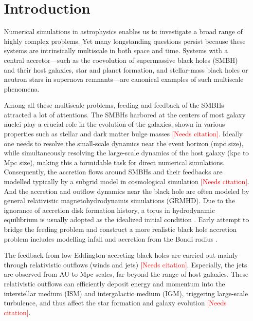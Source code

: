 \documentclass[%
 reprint,
 superscriptaddress,
 amsmath,amssymb,
 nofootinbib,
 prd,
]{revtex4-2}
\newcommand{\red}{\textcolor{red}}
\newcommand{\AddCite}{\red{[Needs citation]}}
\newcommand{\hywcom}[1]{{\color{purple}{[HYW: #1]}}}
\begin{document}
\section{Introduction}

\hywcom{Multiscale problems.}
Numerical simulations in astrophysics enables us to investigate a broad range of highly complex problems.
Yet many longstanding questions persist because these systems are intrinsically multiscale in both space and time.
Systems with a central accretor—such as the coevolution of supermassive black holes (SMBH) and their host galaxies, star and planet formation, and stellar-mass black holes or neutron stars in supernova remnants—are canonical examples of such multiscale phenomena.

Among all these multiscale problems, feeding and feedback of the SMBHs attracted a lot of attentions.
The SMBHs harbored at the centers of most galaxy nuclei play a crucial role in the evolution of the galaxies, shown in various properties such as stellar and dark matter bulge masses \AddCite.
Ideally one needs to resolve the small-scale dynamics near the event horizon (mpc size), while simultaneously
resolving the large-scale dynamics of the host galaxy (kpc to Mpc size),
making this a formidable task for direct numerical simulations.
Consequently, the accretion flows around SMBHs and their feedbacks are modelled typically by a subgrid model in cosmological simulation \AddCite. 
And the accretion and outflow dynamics near the black hole are often modeled by general relativistic magnetohydrodynamis simulations (GRMHD).
Due to the ignorance of accretion disk formation history, a torus in hydrodynamic equilibrium is usually adopted as the idealized initial condition \cite{1976ApJ...207..962F}.
Early attempt to bridge the feeding problem and construct a more realistic black hole accretion problem includes modelling infall and accretion from the Bondi radius \cite{Bondi:1952MNRAS.112..195B}.

\hywcom{Relativistic outflows.}
The feedback from low-Eddington accreting black holes are carried out mainly through relativistic outflows (winds and jets) \AddCite.
Especially, the jets are observed from AU to Mpc scales, far beyond the range of host galaxies. 
These relativistic outflows can efficiently deposit energy and momentum into the interstellar medium (ISM) and intergalactic medium (IGM), triggering large-scale turbulence, and thus affect the star formation and galaxy evolution \AddCite.
\end{document}
